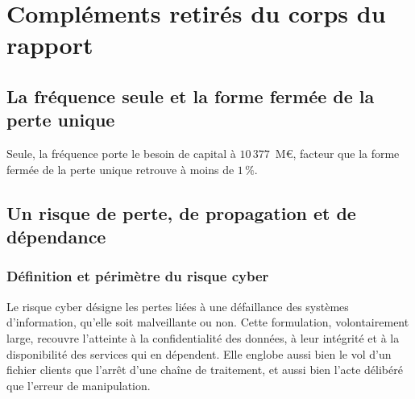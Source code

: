 
\chapter{Compléments retirés du corps du rapport}
\label{supp:diagnostics}

\section{La fréquence seule et la forme fermée de la perte unique}

Seule, la fréquence porte le besoin de capital à $10\,377$~M\euro{}, facteur que la forme fermée de
la perte unique retrouve à moins de $1\,\%$.

\section{Un risque de perte, de propagation et de dépendance}

\subsection{Définition et périmètre du risque cyber}

Le risque cyber désigne les pertes liées à une défaillance des systèmes d'information, qu'elle
soit malveillante ou non. Cette formulation, volontairement large, recouvre l'atteinte à la
confidentialité des données, à leur intégrité et à la disponibilité des services qui en
dépendent. Elle englobe aussi bien le vol d'un fichier clients que l'arrêt d'une chaîne de
traitement, et aussi bien l'acte délibéré que l'erreur de manipulation.

